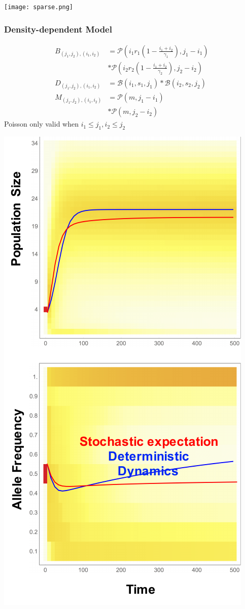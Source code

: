 \documentclass{beamer}
\begin{document}
\begin{frame}
\begin{center}
\texttt{[image: sparse.png]}
\end{center}
\end{frame}

\begin{frame}
\frametitle{Density-dependent Model}
\begin{minipage}{0.45\textwidth}
\tiny
\begin{center}
\end{center}
\begin{equation*}
\begin{aligned}
B_{(j_1,j_2),(i_1,i_2)}&=\mathcal{P}\left(i_1 r_1(1-\frac{i_1+i_2}{\gamma_1}),j_1-i_1\right)\\
&*\mathcal{P}\left(i_2 r_2(1-\frac{i_1+i_2}{\gamma_2}),j_2-i_2\right)\\
D_{(j_1,j_2),(i_1,i_2)} &=\mathcal{B}\left(i_1,s_1,j_1\right)*\mathcal{B}\left(i_2,s_2,j_2\right)\\
M_{(j_1,j_2),(i_1,i_2)} &=\mathcal{P}\left(m,j_1-i_1\right)\\
&*\mathcal{P}\left(m,j_2-i_2\right)
\end{aligned}
\end{equation*}
Poisson only valid when \(i_1\leq j_1, i_2\leq j_2\)
\normalsize
\end{minipage}%
\begin{minipage}{0.45\textwidth}
\begin{center}
\includegraphics[width=0.7\columnwidth]{DensityDependence.pdf}

\end{center}
\end{minipage}
\end{frame}
\end{document}
